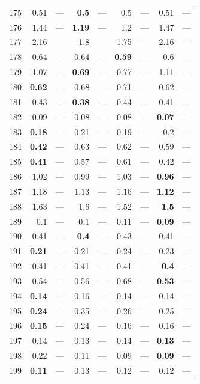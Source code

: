 \begin{longtable}{lr@{\hskip 4pt}l@{\hskip 12pt}r@{\hskip 4pt}l@{\hskip 12pt}r@{\hskip 4pt}l@{\hskip 12pt}r@{\hskip 4pt}l@{\hskip 12pt}}
175 & 0.51 & --- & \textbf{0.5} & --- & 0.5 & --- & 0.51 & --- \\
176 & 1.44 & --- & \textbf{1.19} & --- & 1.2 & --- & 1.47 & --- \\
177 & 2.16 & --- & 1.8 & --- & 1.75 & --- & 2.16 & --- \\
178 & 0.64 & --- & 0.64 & --- & \textbf{0.59} & --- & 0.6 & --- \\
179 & 1.07 & --- & \textbf{0.69} & --- & 0.77 & --- & 1.11 & --- \\
180 & \textbf{0.62} & --- & 0.68 & --- & 0.71 & --- & 0.62 & --- \\
181 & 0.43 & --- & \textbf{0.38} & --- & 0.44 & --- & 0.41 & --- \\
182 & 0.09 & --- & 0.08 & --- & 0.08 & --- & \textbf{0.07} & --- \\
183 & \textbf{0.18} & --- & 0.21 & --- & 0.19 & --- & 0.2 & --- \\
184 & \textbf{0.42} & --- & 0.63 & --- & 0.62 & --- & 0.59 & --- \\
185 & \textbf{0.41} & --- & 0.57 & --- & 0.61 & --- & 0.42 & --- \\
186 & 1.02 & --- & 0.99 & --- & 1.03 & --- & \textbf{0.96} & --- \\
187 & 1.18 & --- & 1.13 & --- & 1.16 & --- & \textbf{1.12} & --- \\
188 & 1.63 & --- & 1.6 & --- & 1.52 & --- & \textbf{1.5} & --- \\
189 & 0.1 & --- & 0.1 & --- & 0.11 & --- & \textbf{0.09} & --- \\
190 & 0.41 & --- & \textbf{0.4} & --- & 0.43 & --- & 0.41 & --- \\
191 & \textbf{0.21} & --- & 0.21 & --- & 0.24 & --- & 0.23 & --- \\
192 & 0.41 & --- & 0.41 & --- & 0.41 & --- & \textbf{0.4} & --- \\
193 & 0.54 & --- & 0.56 & --- & 0.68 & --- & \textbf{0.53} & --- \\
194 & \textbf{0.14} & --- & 0.16 & --- & 0.14 & --- & 0.14 & --- \\
195 & \textbf{0.24} & --- & 0.35 & --- & 0.26 & --- & 0.25 & --- \\
196 & \textbf{0.15} & --- & 0.24 & --- & 0.16 & --- & 0.16 & --- \\
197 & 0.14 & --- & 0.13 & --- & 0.14 & --- & \textbf{0.13} & --- \\
198 & 0.22 & --- & 0.11 & --- & 0.09 & --- & \textbf{0.09} & --- \\
199 & \textbf{0.11} & --- & 0.13 & --- & 0.12 & --- & 0.12 & --- \\

\end{longtable}
